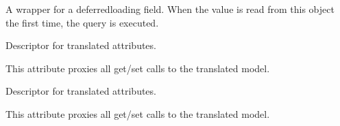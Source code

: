 \documentclass[letterpaper,10pt,english]{sphinxmanual}
\begin{document}
\begin{fulllineitems}
\begin{fulllineitems}
\label{\detokenize{index:bookings.models.OtherPrice.id}}
\pysigstartsignatures
\pysigline
{}
\pysigstopsignatures
\sphinxAtStartPar
A wrapper for a deferred\sphinxhyphen{}loading field. When the value is read from this
object the first time, the query is executed.

\end{fulllineitems}


\begin{fulllineitems}
\label{\detokenize{index:bookings.models.OtherPrice.price_tourist_tax}}
\pysigstartsignatures
\pysigline
{}
\pysigstopsignatures
\sphinxAtStartPar
Descriptor for translated attributes.

\sphinxAtStartPar
This attribute proxies all get/set calls to the translated model.

\end{fulllineitems}


\begin{fulllineitems}
\label{\detokenize{index:bookings.models.OtherPrice.tourist_tax_date}}
\pysigstartsignatures
\pysigline
{}
\pysigstopsignatures
\sphinxAtStartPar
Descriptor for translated attributes.

\sphinxAtStartPar
This attribute proxies all get/set calls to the translated model.

\end{fulllineitems}


\end{fulllineitems}

\end{document}
